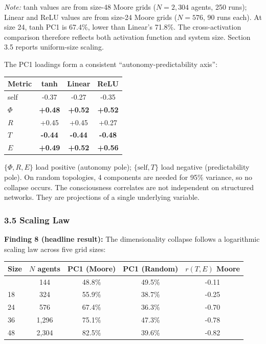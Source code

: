 \documentclass[
  11pt,
]{article}
\begin{document}
\noindent\emph{Note:} tanh values are from size-48 Moore grids ($N = 2{,}304$
agents, 250 runs); Linear and ReLU values are from size-24 Moore grids
($N = 576$, 90 runs each). At size 24, tanh PC1 is 67.4\%, lower than
Linear's 71.8\%. The cross-activation comparison therefore reflects both
activation function and system size. Section 3.5 reports uniform-size scaling.

The PC1 loadings form a consistent ``autonomy-predictability axis'':

\begin{longtable}[]{@{}lccc@{}}
\toprule\noalign{}
Metric & tanh & Linear & ReLU \\
\midrule\noalign{}
\endhead
\bottomrule\noalign{}
\endlastfoot
self & -0.37 & -0.27 & -0.35 \\
\(\Phi\) & \textbf{+0.48} & \textbf{+0.52} & \textbf{+0.52} \\
\(R\) & +0.45 & +0.45 & +0.27 \\
\(T\) & \textbf{-0.44} & \textbf{-0.44} & \textbf{-0.48} \\
\(E\) & \textbf{+0.49} & \textbf{+0.52} & \textbf{+0.56} \\
\end{longtable}

\(\{\Phi, R, E\}\) load positive (autonomy pole); \(\{\text{self}, T\}\)
load negative (predictability pole). On random topologies, 4 components
are needed for 95\% variance, so no collapse occurs. The consciousness
correlates are not independent on structured networks. They are
projections of a single underlying variable.

\subsubsection{3.5 Scaling Law}\label{scaling-law}

\textbf{Finding 8 (headline result):} The dimensionality collapse
follows a logarithmic scaling law across five grid sizes:

\begin{longtable}[]{@{}lcccc@{}}
\toprule\noalign{}
Size & \(N\) agents & PC1 (Moore) & PC1 (Random) & \(r(T,E)\) Moore \\
\midrule\noalign{}
\endhead
\bottomrule\noalign{}
\endlastfoot
12 & 144 & 48.8\% & 49.5\% & -0.11 \\
18 & 324 & 55.9\% & 38.7\% & -0.25 \\
24 & 576 & 67.4\% & 36.3\% & -0.70 \\
36 & 1,296 & 75.1\% & 47.3\% & -0.78 \\
48 & 2,304 & 82.5\% & 39.6\% & -0.82 \\
\end{longtable}
\end{document}
